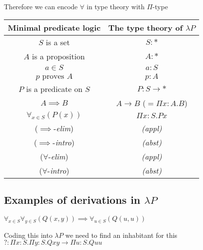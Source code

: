 \documentclass[12pt, a4paper]{article}
\begin{document}
 Therefore we can encode $\forall$ in type theory with $\Pi$-type

 \begin{center}
    \begin{tabular}{| c | c |} 
     \hline
     Minimal predicate logic & The type theory of $\lambda P$ \\
     \hline
     \hline
     $S$ is a set & $S : *$\\
     $A$ is a proposition & $A : *$\\
    \hline
    $a \in S$ & $a : S$\\
    $p \text{ proves } A$ & $p : A$\\
    \hline
    $P$ is a predicate on $S$ & $P : S \to *$\\
    \hline
    \hline
    $A \implies B$ & $A \to B$ ($= \Pi x: A . B$)\\
    $\forall_{x \in S}(P(x))$ & $\Pi x: S . Px$\\
    \hline
    \hline
    ($\implies$-\textit{elim}) & \textit{(appl)}\\
    ($\implies$-\textit{intro}) & \textit{(abst)}\\
    \hline
    ($\forall$-\textit{elim}) & \textit{(appl)}\\
    ($\forall$-\textit{intro}) & \textit{(abst)}\\
    \hline
   \end{tabular}
\end{center}

\subsection{Examples of derivations in \texorpdfstring{$\lambda P$}{}}

$\forall_{x \in S}\forall_{y \in S}(Q(x,y)) \implies \forall_{u \in S}(Q(u,u))$


\begin{flagderiv}
\end{flagderiv}

Coding this into $\lambda P$ we need to find an inhabitant for this $? : \Pi x  : S. \Pi y : S. Qxy \to \Pi u : S. Quu$
\end{document}
